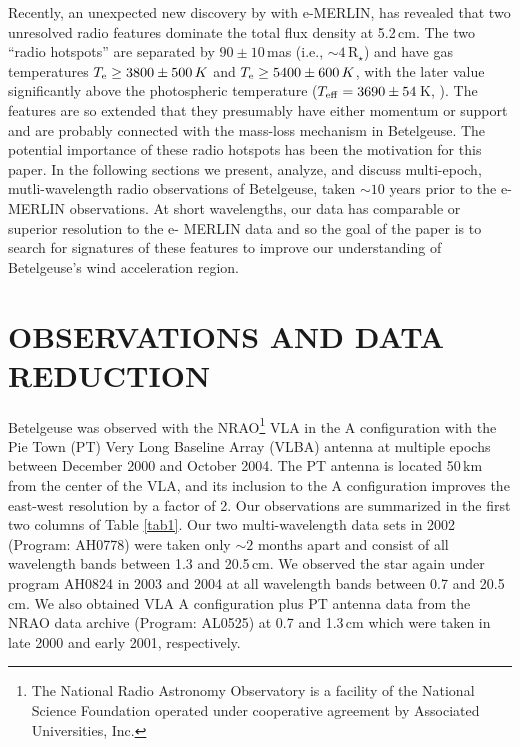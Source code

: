 \documentclass[iop]{emulateapj}
\begin{document}
Recently, an unexpected new discovery by \cite{richards_2013} with e-MERLIN, has revealed that two unresolved radio features dominate the total flux density at 5.2\,cm. The two ``radio hotspots'' are separated by $90\pm 10$\,mas (i.e., $\sim 4\,$R$_{\star}$) and have gas temperatures $T_{\rm{e}} \geq 3800\pm 500\,K$ and $T_{\rm{e}} \geq 5400\pm 600\,K$, with the later value significantly above the photospheric temperature ($T_{\rm{eff}}=3690\pm 54\,$K, \citealt{ohnaka_2011}). The features are so extended that they presumably have either momentum or support and are probably connected with the mass-loss mechanism in Betelgeuse. The potential importance of these radio hotspots has been the motivation for this paper. In the following sections we present, analyze, and discuss multi-epoch, mutli-wavelength radio observations of Betelgeuse, taken $\sim 10$ years prior to the e-MERLIN observations. At short wavelengths, our data has comparable or superior resolution to the e- MERLIN data and so the goal of the paper is to search for signatures of these features to improve our understanding of Betelgeuse's wind acceleration region.

\section{OBSERVATIONS AND DATA REDUCTION}
Betelgeuse was observed with the NRAO\footnote{The National Radio Astronomy Observatory is a facility of
the National Science Foundation operated under cooperative agreement by Associated Universities, Inc.} VLA  in the A configuration with the Pie Town (PT) Very Long Baseline Array (VLBA) antenna at multiple epochs between December 2000 and October 2004. The PT antenna is located 50\,km from the center of the VLA, and its inclusion to the A configuration improves the east-west resolution by a factor of 2. Our observations are summarized in the first two columns of Table \ref{tab1}. Our two multi-wavelength data sets in 2002 (Program: AH0778) were taken only $\sim 2$ months apart and consist of all wavelength bands between 1.3 and 20.5\,cm. We observed the star again under program AH0824 in 2003 and 2004 at all wavelength bands between 0.7 and 20.5\,cm. We also obtained VLA A configuration plus PT antenna data from the NRAO data archive (Program: AL0525) at  0.7 and 1.3\,cm which were taken in late 2000 and early 2001, respectively.
\end{document}
